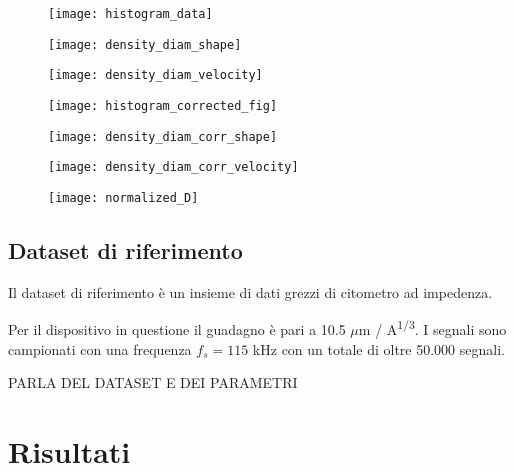 \begin{figure*}[t!]
	\centering
		\begin{subfigure}{0.33\linewidth}
		\centering
		\texttt{[image: histogram\_data]}
		\caption{}
	\end{subfigure}\hfill
	\begin{subfigure}{0.33\linewidth}
		\centering
		\texttt{[image: density\_diam\_shape]}
		\caption{}
	\end{subfigure}\hfill
	\begin{subfigure}{0.33\linewidth}
		\centering
		\texttt{[image: density\_diam\_velocity]}
		\caption{}
	\end{subfigure}\hfill
	\begin{subfigure}{0.33\linewidth}
	\centering
	\texttt{[image: histogram\_corrected\_fig]}
	\caption{}
\end{subfigure}\hfill
	\begin{subfigure}{0.33\linewidth}
	\centering
	\texttt{[image: density\_diam\_corr\_shape]}
	\caption{}
\end{subfigure}\hfill
\begin{subfigure}{0.33\linewidth}
	\centering
	\texttt{[image: density\_diam\_corr\_velocity]}
	\caption{}
\end{subfigure}
	\caption{}
	\label{fig:density}
\end{figure*}

\begin{figure}[t!]
	\centering
	\texttt{[image: normalized\_D]}
	\caption{}
	\label{fig:normalizedDensity}
\end{figure}



\subsection{Dataset di riferimento}

Il dataset di riferimento è un insieme di dati grezzi di citometro ad impedenza.  

Per il dispositivo in questione il guadagno è pari a 10.5 $\mu$m / A\textsuperscript{1/3}. I segnali sono campionati con una frequenza $f_s=115$ kHz con un totale di oltre 50.000 segnali.


PARLA DEL DATASET E DEI PARAMETRI 

\section{Risultati}

